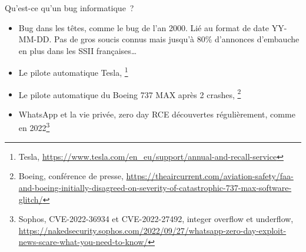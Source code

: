 \documentclass{beamer}
\begin{document}
    \begin{frame}{Qu'est-ce qu'un bug informatique~?}
        \begin{itemize}

            \item Bug dans les têtes, comme le bug de l'an 2000.
            Lié au format de date YY-MM-DD. Pas de gros soucis connus mais jusqu'à 80\% d'annonces d'embauche en plus dans les SSII françaises…
            \item Le pilote automatique Tesla, \footnote{Tesla, \url{https://www.tesla.com/en_eu/support/annual-and-recall-service}}
            \item Le pilote automatique du Boeing 737 MAX après 2 crashes, \footnote{Boeing, conférence de presse, \url{https://theaircurrent.com/aviation-safety/faa-and-boeing-initially-disagreed-on-severity-of-catastrophic-737-max-software-glitch/}}
            \item WhatsApp et la vie privée, zero day RCE découvertes régulièrement, comme en 2022\footnote{Sophos, CVE-2022-36934 et CVE-2022-27492, integer overflow et underflow, \url{https://nakedsecurity.sophos.com/2022/09/27/whatsapp-zero-day-exploit-news-scare-what-you-need-to-know/}}
        \end{itemize}
    \end{frame}
\end{document}
